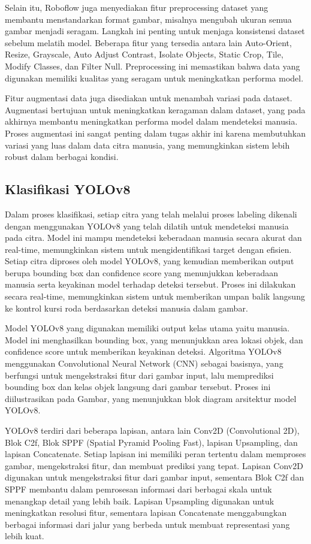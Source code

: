 Selain itu, Roboflow juga menyediakan fitur preprocessing dataset yang membantu menstandarkan format gambar, misalnya mengubah ukuran semua gambar menjadi seragam. Langkah ini penting untuk menjaga konsistensi dataset sebelum melatih model. Beberapa fitur yang tersedia antara lain Auto-Orient, Resize, Grayscale, Auto Adjust Contrast, Isolate Objects, Static Crop, Tile, Modify Classes, dan Filter Null. Preprocessing ini memastikan bahwa data yang digunakan memiliki kualitas yang seragam untuk meningkatkan performa model.

Fitur augmentasi data juga disediakan untuk menambah variasi pada dataset. Augmentasi bertujuan untuk meningkatkan keragaman dalam dataset, yang pada akhirnya membantu meningkatkan performa model dalam mendeteksi manusia. Proses augmentasi ini sangat penting dalam tugas akhir ini karena membutuhkan variasi yang luas dalam data citra manusia, yang memungkinkan sistem lebih robust dalam berbagai kondisi.

\subsection{Klasifikasi YOLOv8}
\label{subsec:klasifikasiyolov8}

Dalam proses klasifikasi, setiap citra yang telah melalui proses labeling dikenali dengan menggunakan YOLOv8 yang telah dilatih untuk mendeteksi manusia pada citra. Model ini mampu mendeteksi keberadaan manusia secara akurat dan real-time, memungkinkan sistem untuk mengidentifikasi target dengan efisien. Setiap citra diproses oleh model YOLOv8, yang kemudian memberikan output berupa bounding box dan confidence score yang menunjukkan keberadaan manusia serta keyakinan model terhadap deteksi tersebut. Proses ini dilakukan secara real-time, memungkinkan sistem untuk memberikan umpan balik langsung ke kontrol kursi roda berdasarkan deteksi manusia dalam gambar.

Model YOLOv8 yang digunakan memiliki output kelas utama yaitu manusia. Model ini menghasilkan bounding box, yang menunjukkan area lokasi objek, dan confidence score untuk memberikan keyakinan deteksi. Algoritma YOLOv8 menggunakan Convolutional Neural Network (CNN) sebagai basisnya, yang berfungsi untuk mengekstraksi fitur dari gambar input, lalu memprediksi bounding box dan kelas objek langsung dari gambar tersebut. Proses ini diilustrasikan pada Gambar, yang menunjukkan blok diagram arsitektur model YOLOv8.

YOLOv8 terdiri dari beberapa lapisan, antara lain Conv2D (Convolutional 2D), Blok C2f, Blok SPPF (Spatial Pyramid Pooling Fast), lapisan Upsampling, dan lapisan Concatenate. Setiap lapisan ini memiliki peran tertentu dalam memproses gambar, mengekstraksi fitur, dan membuat prediksi yang tepat. Lapisan Conv2D digunakan untuk mengekstraksi fitur dari gambar input, sementara Blok C2f dan SPPF membantu dalam pemrosesan informasi dari berbagai skala untuk menangkap detail yang lebih baik. Lapisan Upsampling digunakan untuk meningkatkan resolusi fitur, sementara lapisan Concatenate menggabungkan berbagai informasi dari jalur yang berbeda untuk membuat representasi yang lebih kuat.

